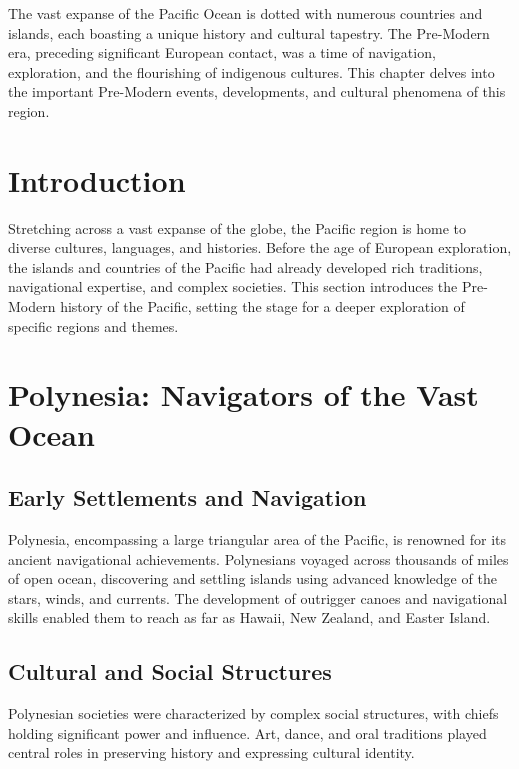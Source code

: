 \documentclass[a4paper,12pt]{book}
\begin{document}
The vast expanse of the Pacific Ocean is dotted with numerous countries and islands, each boasting a unique history and cultural tapestry. The Pre-Modern era, preceding significant European contact, was a time of navigation, exploration, and the flourishing of indigenous cultures. This chapter delves into the important Pre-Modern events, developments, and cultural phenomena of this region.

\section{Introduction}
\label{sec:introduction-pre-modern-pacific}

Stretching across a vast expanse of the globe, the Pacific region is home to diverse cultures, languages, and histories. Before the age of European exploration, the islands and countries of the Pacific had already developed rich traditions, navigational expertise, and complex societies. This section introduces the Pre-Modern history of the Pacific, setting the stage for a deeper exploration of specific regions and themes.

\section{Polynesia: Navigators of the Vast Ocean}
\label{sec:polynesia}

\subsection{Early Settlements and Navigation}
\label{subsec:polynesia-settlements-navigation}

Polynesia, encompassing a large triangular area of the Pacific, is renowned for its ancient navigational achievements. Polynesians voyaged across thousands of miles of open ocean, discovering and settling islands using advanced knowledge of the stars, winds, and currents. The development of outrigger canoes and navigational skills enabled them to reach as far as Hawaii, New Zealand, and Easter Island.

\subsection{Cultural and Social Structures}
\label{subsec:polynesia-culture-society}

Polynesian societies were characterized by complex social structures, with chiefs holding significant power and influence. Art, dance, and oral traditions played central roles in preserving history and expressing cultural identity.
\end{document}

